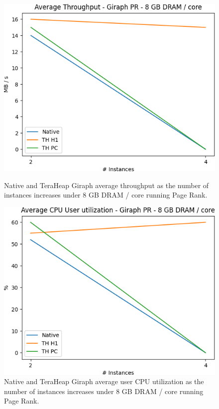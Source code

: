 \begin{figure}[thbp]
        \centering
        \includegraphics[width=\linewidth]{./fig/G_PR_128_THR.png}
    \caption{Native and TeraHeap Giraph average throughput
        as the number of instances increases under 8 GB DRAM / core running Page Rank.}
                \label{fig:g_pr_128_thr}
        \includegraphics[width=\linewidth]{./fig/G_PR_128_USR.png}
    \caption{Native and TeraHeap Giraph average user CPU utilization
        as the number of instances increases under 8 GB DRAM / core running Page Rank.}
        \label{fig:g_pr_128_usr}
\end{figure}

